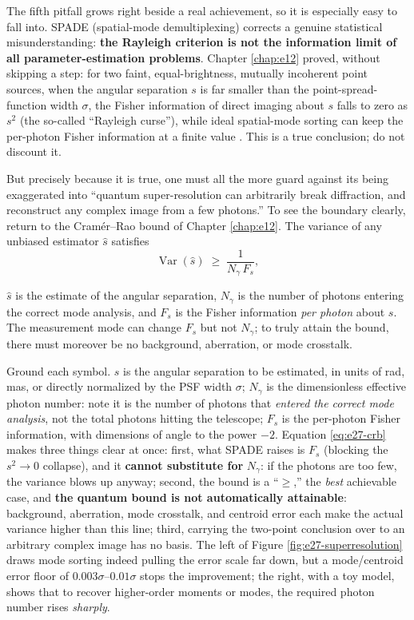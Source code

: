 The fifth pitfall grows right beside a real achievement, so it is especially easy to fall into. SPADE (spatial-mode demultiplexing) corrects a genuine statistical misunderstanding: \textbf{the Rayleigh criterion is not the information limit of all parameter-estimation problems}. Chapter \ref{chap:e12} proved, without skipping a step: for two faint, equal-brightness, mutually incoherent point sources, when the angular separation \(s\) is far smaller than the point-spread-function width \(\sigma\), the Fisher information of direct imaging about \(s\) falls to zero as \(s^2\) (the so-called ``Rayleigh curse''), while ideal spatial-mode sorting can keep the per-photon Fisher information at a finite value \citep{2015Optic...2..646T,2016PhRvX...6c1033T,2016OExpr..24.3684N,2017PhRvL.118g0801T}. This is a true conclusion; do not discount it.

But precisely because it is true, one must all the more guard against its being exaggerated into ``quantum super-resolution can arbitrarily break diffraction, and reconstruct any complex image from a few photons.'' To see the boundary clearly, return to the Cramér--Rao bound of Chapter \ref{chap:e12}. The variance of any unbiased estimator \(\hat s\) satisfies
\begin{equation}
  \operatorname{Var}(\hat s)\;\ge\;\frac{1}{N_\gamma\,F_s},
  \label{eq:e27-crb}
\end{equation}
\begin{formulaexplain}
\(\hat s\) is the estimate of the angular separation, \(N_\gamma\) is the number of photons entering the correct mode analysis, and \(F_s\) is the Fisher information \emph{per photon} about \(s\). The measurement mode can change \(F_s\) but not \(N_\gamma\); to truly attain the bound, there must moreover be no background, aberration, or mode crosstalk.
\end{formulaexplain}

Ground each symbol. \(s\) is the angular separation to be estimated, in units of rad, mas, or directly normalized by the PSF width \(\sigma\); \(N_\gamma\) is the dimensionless effective photon number: note it is the number of photons that \emph{entered the correct mode analysis}, not the total photons hitting the telescope; \(F_s\) is the per-photon Fisher information, with dimensions of angle to the power \(-2\). Equation \eqref{eq:e27-crb} makes three things clear at once: first, what SPADE raises is \(F_s\) (blocking the \(s^2\to0\) collapse), and it \textbf{cannot substitute for }\(N_\gamma\): if the photons are too few, the variance blows up anyway; second, the bound is a ``\(\ge\),'' the \emph{best} achievable case, and \textbf{the quantum bound is not automatically attainable}: background, aberration, mode crosstalk, and centroid error each make the actual variance higher than this line; third, carrying the two-point conclusion over to an arbitrary complex image has no basis. The left of Figure \ref{fig:e27-superresolution} draws mode sorting indeed pulling the error scale far down, but a mode/centroid error floor of \(0.003\sigma\)--\(0.01\sigma\) stops the improvement; the right, with a toy model, shows that to recover higher-order moments or modes, the required photon number rises \emph{sharply}.


